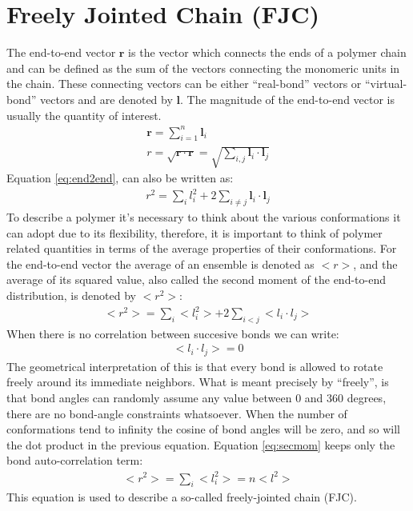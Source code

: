 \section{Freely Jointed Chain (FJC)}
The end-to-end  vector $\mathbf{r}$ is  the vector which  connects the
ends of a polymer  chain and can be defined as the  sum of the vectors
connecting the monomeric units  in the chain. These connecting vectors
can be  either ``real-bond''  vectors or ``virtual-bond''  vectors and
are denoted  by $\mathbf{l}$.  The magnitude of  the end-to-end vector
is usually the quantity of interest.
\begin{gather}
\mathbf{r} = \sum_{i=1}^{n} \mathbf{l}_{i}\\
\label{eq:end2end}
r = \sqrt{\mathbf{r} \cdot \mathbf{r}}
  = \sqrt{\sum_{i,j}\mathbf{l}_{i} \cdot \mathbf{l}_{j}}
\end{gather}
Equation \ref{eq:end2end}, can also be written as:
\begin{gather}
r^2 = \sum_{i}l_{i}^{2} + 2 \sum_{i\neq j} \mathbf{l}_{i} \cdot \mathbf{l}_{j}
\end{gather}  
To  describe a  polymer  it's  necessary to  think  about the  various
conformations it  can adopt due  to its flexibility, therefore,  it is
important  to think  of polymer  related  quantities in  terms of  the
average properties  of their conformations. For  the end-to-end vector
the average of an ensemble is denoted as $<r>$, and the average of its
squared  value,  also  called  the  second moment  of  the  end-to-end
distribution, is denoted by $<r^2>$:
\begin{gather}
\label{eq:secmom}  
<r^2>=\sum_{i}<l_{i}^2> + 2\sum_{i<j}<l_{i} \cdot l_{j}>
\end{gather}  
When there is no correlation between succesive bonds we can write:
\begin{gather}
\label{eq:nocorr}
<l_{i} \cdot l_{j}> = 0
\end{gather}
The geometrical interpretation  of this is that every  bond is allowed
to  rotate  freely around  its  immediate  neighbors.   What is  meant
precisely by ``freely'',  is that bond angles can  randomly assume any
value between 0  and 360 degrees, there are  no bond-angle constraints
whatsoever.   When the number  of conformations  tend to  infinity the
cosine of bond angles will be zero, and so will the dot product in the
previous  equation.   Equation  \ref{eq:secmom}  keeps only  the  bond
auto-correlation term:
\begin{gather}
<r^2> = \sum_{i}<l_{i}^2> = n<l^2>
\end{gather}  
This equation is used to describe a so-called freely-jointed chain (FJC). 

